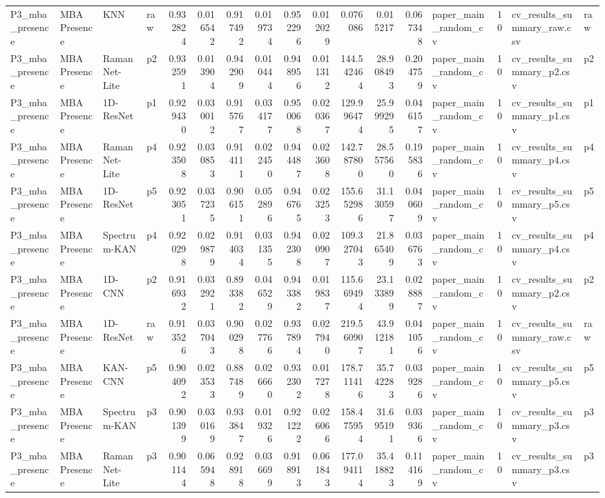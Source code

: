 \begin{tabular}{llllrrrrrrrrrlrll}
P3_mba_presence & MBA Presence & KNN & raw & 0.932824 & 0.016542 & 0.917492 & 0.019734 & 0.952296 & 0.012029 & 0.076086 & 0.015217 & 0.067348 & paper_main_random_cv & 10 & cv_results_summary_raw.csv & raw \\
P3_mba_presence & MBA Presence & RamanNet-Lite & p2 & 0.932591 & 0.013904 & 0.942909 & 0.010444 & 0.948956 & 0.011312 & 144.542464 & 28.908493 & 0.204759 & paper_main_random_cv & 10 & cv_results_summary_p2.csv & p2 \\
P3_mba_presence & MBA Presence & 1D-ResNet & p1 & 0.929430 & 0.030012 & 0.915767 & 0.034177 & 0.950068 & 0.020367 & 129.996474 & 25.999295 & 0.046157 & paper_main_random_cv & 10 & cv_results_summary_p1.csv & p1 \\
P3_mba_presence & MBA Presence & RamanNet-Lite & p4 & 0.923508 & 0.030853 & 0.914111 & 0.022450 & 0.944487 & 0.023608 & 142.787800 & 28.557560 & 0.195836 & paper_main_random_cv & 10 & cv_results_summary_p4.csv & p4 \\
P3_mba_presence & MBA Presence & 1D-ResNet & p5 & 0.923051 & 0.037235 & 0.906151 & 0.052896 & 0.946765 & 0.023253 & 155.652986 & 31.130597 & 0.040609 & paper_main_random_cv & 10 & cv_results_summary_p5.csv & p5 \\
P3_mba_presence & MBA Presence & Spectrum-KAN & p4 & 0.920298 & 0.029879 & 0.914034 & 0.031355 & 0.942308 & 0.020907 & 109.327043 & 21.865409 & 0.036763 & paper_main_random_cv & 10 & cv_results_summary_p4.csv & p4 \\
P3_mba_presence & MBA Presence & 1D-CNN & p2 & 0.916932 & 0.032921 & 0.893382 & 0.046529 & 0.943382 & 0.019837 & 115.669494 & 23.133899 & 0.028887 & paper_main_random_cv & 10 & cv_results_summary_p2.csv & p2 \\
P3_mba_presence & MBA Presence & 1D-ResNet & raw & 0.913526 & 0.037043 & 0.900298 & 0.027766 & 0.937894 & 0.027940 & 219.560907 & 43.912181 & 0.041056 & paper_main_random_cv & 10 & cv_results_summary_raw.csv & raw \\
P3_mba_presence & MBA Presence & KAN-CNN & p5 & 0.904092 & 0.023533 & 0.887489 & 0.026660 & 0.932302 & 0.017278 & 178.711416 & 35.742283 & 0.039286 & paper_main_random_cv & 10 & cv_results_summary_p5.csv & p5 \\
P3_mba_presence & MBA Presence & Spectrum-KAN & p3 & 0.901399 & 0.030169 & 0.933847 & 0.019326 & 0.921222 & 0.026066 & 158.475954 & 31.695191 & 0.039366 & paper_main_random_cv & 10 & cv_results_summary_p3.csv & p3 \\
P3_mba_presence & MBA Presence & RamanNet-Lite & p3 & 0.901144 & 0.065948 & 0.928918 & 0.036699 & 0.918913 & 0.061843 & 177.094114 & 35.418823 & 0.114169 & paper_main_random_cv & 10 & cv_results_summary_p3.csv & p3 \\

\end{tabular}
